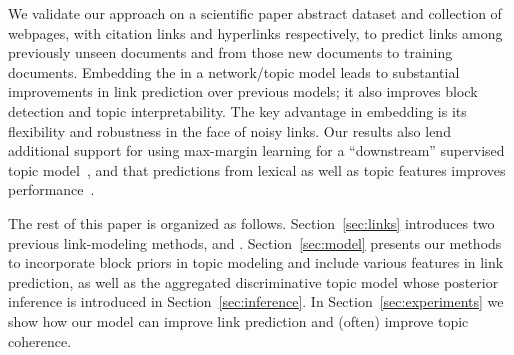 We validate our approach on a scientific paper abstract dataset and collection of webpages,
with citation links and hyperlinks respectively, to predict links among previously unseen documents and
from those new documents to training documents. Embedding the \wsbm in
a network/topic model leads to substantial improvements in link
prediction over previous models; it also improves block detection and
topic interpretability. The key advantage in embedding \wsbm is its
flexibility and robustness in the face of noisy links. Our results
also lend additional support for using max-margin learning for a
``downstream'' supervised topic model~\cite{mcauliffe-2008-slda}, and
that predictions from lexical as well as topic features improves
performance~\cite{nguyen-2013-lexical}.

The rest of this paper is organized as follows.  Section~\ref{sec:links}
introduces two previous link-modeling methods, \wsbm and \rtm.
Section~\ref{sec:model} presents our methods to incorporate block priors in
topic modeling and include various features in link prediction, as well as the
aggregated discriminative topic model whose posterior inference is introduced in
Section~\ref{sec:inference}.  In Section~\ref{sec:experiments} we show how our
model can improve link prediction and (often) improve topic coherence.

